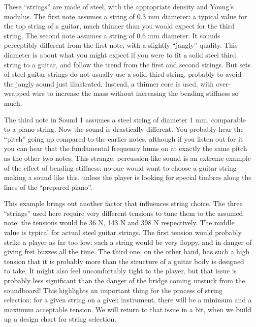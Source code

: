 \audio{}

  These ``strings'' are made of steel, with the appropriate density and Young's 
  modulus. The first note assumes a string of 0.3 mm diameter: a typical value 
  for the top string of a guitar, much thinner than you would expect for the 
  third string. The second note assumes a string of 0.6 mm diameter. It sounds 
  perceptibly different from the first note, with a slightly ``jangly'' 
  quality. This diameter is about what you might expect if you were to fit a 
  solid steel third string to a guitar, and follow the trend from the first and 
  second strings. But sets of steel guitar strings do not usually use a solid 
  third string, probably to avoid the jangly sound just illustrated. Instead, a 
  thinner core is used, with over-wrapped wire to increase the mass without 
  increasing the bending stiffness so much. 

  The third note in Sound 1 assumes a steel string of diameter 1 mm, comparable 
  to a piano string. Now the sound is drastically different. You probably hear 
  the ``pitch'' going up compared to the earlier notes, although if you listen 
  out for it you can hear that the fundamental frequency hums on at exactly the 
  same pitch as the other two notes. This strange, percussion-like sound is an 
  extreme example of the effect of bending stiffness: no-one would want to 
  choose a guitar string making a sound like this, unless the player is looking 
  for special timbres along the lines of the ``prepared piano''. 

  This example brings out another factor that influences string choice. The 
  three ``strings'' used here require very different tensions to tune them to 
  the assumed note: the tensions would be 36 N, 143 N and 398 N respectively. 
  The middle value is typical for actual steel guitar strings. The first 
  tension would probably strike a player as far too low: such a string would be 
  very floppy, and in danger of giving fret buzzes all the time. The third one, 
  on the other hand, has such a high tension that it is probably more than the 
  structure of a guitar body is designed to take. It might also feel 
  uncomfortably tight to the player, but that issue is probably less 
  significant than the danger of the bridge coming unstuck from the soundboard! 
  This highlights an important thing for the process of string selection: for a 
  given string on a given instrument, there will be a minimum and a maximum 
  acceptable tension. We will return to that issue in a bit, when we build up a 
  design chart for string selection. 

